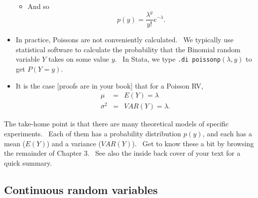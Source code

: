 \documentclass[11pt]{article}
\begin{document}
\begin{itemize}
\begin{itemize}
\item And so%
\begin{equation*}
p\left( y\right) =\frac{\lambda ^{y}}{y!}e^{-\lambda }.
\end{equation*}
\end{itemize}

\item In practice, Poissons are not conveniently calculated. \ We typically
use statistical software to calculate the probability that the Binomial
random variable $Y$ takes on some value $y.$ \ In Stata, we type \texttt{.di
poissonp}$(\lambda ,y)$ to get $P\left( Y=y\right) .$\ 

\item It is the case [proofs are in your book] that for a Poisson RV, 
\begin{eqnarray*}
\mu &=&E\left( Y\right) =\lambda \\
\sigma ^{2} &=&VAR\left( Y\right) =\lambda .
\end{eqnarray*}
\end{itemize}

The take-home point is that there are many theoretical models of specific
experiments. \ Each of them has a probability distribution $p(y)$, and each
has a mean ($E(Y)$) and a variance ($VAR(Y)$). \ Get to know these a bit by
browsing the remainder of Chapter 3. \ See also the inside back cover of
your text for a quick summary.

\subsection{Continuous random variables}
\end{document}
